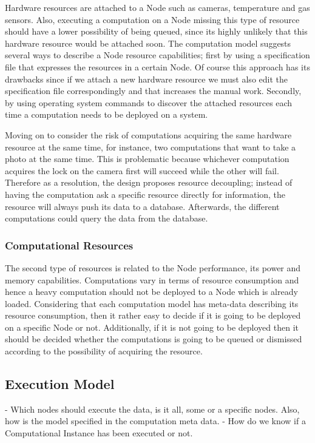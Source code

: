   Hardware resources  are attached to a Node such as cameras, temperature and gas sensors.  Also, executing a computation on a Node missing this type of resource should have a lower possibility of being queued, since its highly unlikely that this hardware resource would be attached soon. The computation model suggests several ways to describe a Node resource capabilities; first by using a specification file that expresses the resources in a certain Node. Of course this approach has its drawbacks since if we attach a new hardware resource we must also edit the specification file correspondingly and that increases the manual work. Secondly, by using operating system commands to discover the attached resources each time a computation needs to be deployed on a system. 
  
  Moving on to consider the risk of computations acquiring the same hardware resource at the same time, for instance, two computations that want to take a photo at the same time. This is problematic because whichever computation acquires the lock on the camera first will succeed while the other will fail. Therefore as a resolution, the design proposes resource decoupling; instead of having the computation ask a specific resource directly for information, the resource will always push its data to a database. Afterwards, the different computations could query the data from the database.
  

\subsubsection{Computational Resources }
The second type of resources is related to the Node performance, its power and memory capabilities. Computations vary in terms of resource consumption and hence a heavy computation should not be deployed to a Node which is already loaded. Considering that each computation model has meta-data describing its resource consumption, then it rather easy to decide if it is going to be deployed on a specific Node or not. Additionally, if it is not going to be deployed then it should be decided whether the computations is going to be queued or dismissed according to the possibility of acquiring the resource.




\newpage


\subsection{Execution Model}
- Which nodes should execute the data, is it all, some  or a specific nodes. Also, how is the model specified in the computation meta data.
- How do we know if a Computational Instance has been executed or not.

